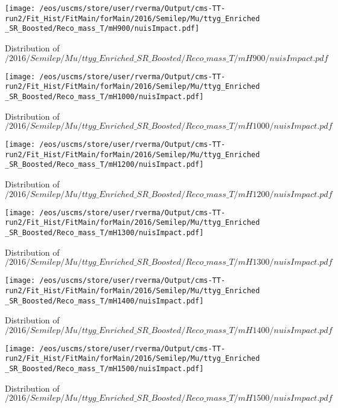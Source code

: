 \begin{figure}
\centering
\texttt{[image: /eos/uscms/store/user/rverma/Output/cms-TT-run2/Fit\_Hist/FitMain/forMain/2016/Semilep/Mu/ttyg\_Enriched\_SR\_Boosted/Reco\_mass\_T/mH900/nuisImpact.pdf]}
\caption{Distribution of $/2016/Semilep/Mu/ttyg\_Enriched\_SR\_Boosted/Reco\_mass\_T/mH900/nuisImpact.pdf$}
\end{figure}

\begin{figure}
\centering
\texttt{[image: /eos/uscms/store/user/rverma/Output/cms-TT-run2/Fit\_Hist/FitMain/forMain/2016/Semilep/Mu/ttyg\_Enriched\_SR\_Boosted/Reco\_mass\_T/mH1000/nuisImpact.pdf]}
\caption{Distribution of $/2016/Semilep/Mu/ttyg\_Enriched\_SR\_Boosted/Reco\_mass\_T/mH1000/nuisImpact.pdf$}
\end{figure}

\begin{figure}
\centering
\texttt{[image: /eos/uscms/store/user/rverma/Output/cms-TT-run2/Fit\_Hist/FitMain/forMain/2016/Semilep/Mu/ttyg\_Enriched\_SR\_Boosted/Reco\_mass\_T/mH1200/nuisImpact.pdf]}
\caption{Distribution of $/2016/Semilep/Mu/ttyg\_Enriched\_SR\_Boosted/Reco\_mass\_T/mH1200/nuisImpact.pdf$}
\end{figure}

\begin{figure}
\centering
\texttt{[image: /eos/uscms/store/user/rverma/Output/cms-TT-run2/Fit\_Hist/FitMain/forMain/2016/Semilep/Mu/ttyg\_Enriched\_SR\_Boosted/Reco\_mass\_T/mH1300/nuisImpact.pdf]}
\caption{Distribution of $/2016/Semilep/Mu/ttyg\_Enriched\_SR\_Boosted/Reco\_mass\_T/mH1300/nuisImpact.pdf$}
\end{figure}

\begin{figure}
\centering
\texttt{[image: /eos/uscms/store/user/rverma/Output/cms-TT-run2/Fit\_Hist/FitMain/forMain/2016/Semilep/Mu/ttyg\_Enriched\_SR\_Boosted/Reco\_mass\_T/mH1400/nuisImpact.pdf]}
\caption{Distribution of $/2016/Semilep/Mu/ttyg\_Enriched\_SR\_Boosted/Reco\_mass\_T/mH1400/nuisImpact.pdf$}
\end{figure}

\begin{figure}
\centering
\texttt{[image: /eos/uscms/store/user/rverma/Output/cms-TT-run2/Fit\_Hist/FitMain/forMain/2016/Semilep/Mu/ttyg\_Enriched\_SR\_Boosted/Reco\_mass\_T/mH1500/nuisImpact.pdf]}
\caption{Distribution of $/2016/Semilep/Mu/ttyg\_Enriched\_SR\_Boosted/Reco\_mass\_T/mH1500/nuisImpact.pdf$}
\end{figure}


